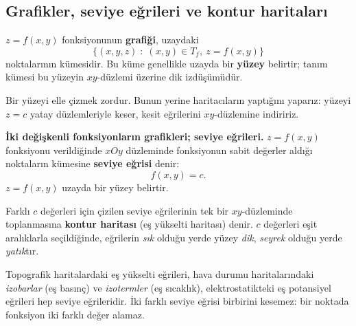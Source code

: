 \subsection{Grafikler, seviye eğrileri ve kontur haritaları}

\begin{tanim}[Grafik]
$z=f(x,y)$ fonksiyonunun \textbf{grafiği}, uzaydaki
\[
\{(x,y,z)\;:\;(x,y)\in T_f,\ z=f(x,y)\}
\]
noktalarının kümesidir. Bu küme genellikle uzayda bir \textbf{yüzey} belirtir; tanım kümesi bu yüzeyin $xy$-düzlemi
üzerine dik izdüşümüdür.
\end{tanim}

Bir yüzeyi elle çizmek zordur. Bunun yerine haritacıların yaptığını yaparız: yüzeyi $z=c$ yatay düzlemleriyle keser,
kesit eğrilerini $xy$-düzlemine indiririz.

\begin{tahta}
\textbf{İki değişkenli fonksiyonların grafikleri; seviye eğrileri.} $z=f(x,y)$ fonksiyonu verildiğinde $xOy$ düzleminde
fonksiyonun sabit değerler aldığı noktaların kümesine \textbf{seviye eğrisi} denir:
\[
f(x,y)=c .
\]
$z=f(x,y)$ uzayda bir yüzey belirtir.
\end{tahta}

\begin{tanim}
Farklı $c$ değerleri için çizilen seviye eğrilerinin tek bir $xy$-düzleminde toplanmasına \textbf{kontur haritası}
(eş yükselti haritası) denir. $c$ değerleri eşit aralıklarla seçildiğinde, eğrilerin \emph{sık} olduğu yerde yüzey
\emph{dik}, \emph{seyrek} olduğu yerde \emph{yatık}tır.
\end{tanim}

\begin{bilgi}
Topografik haritalardaki eş yükselti eğrileri, hava durumu haritalarındaki \emph{izobarlar} (eş basınç) ve
\emph{izotermler} (eş sıcaklık), elektrostatikteki eş potansiyel eğrileri hep seviye eğrileridir. İki farklı seviye
eğrisi birbirini kesemez: bir noktada fonksiyon iki farklı değer alamaz.
\end{bilgi}

